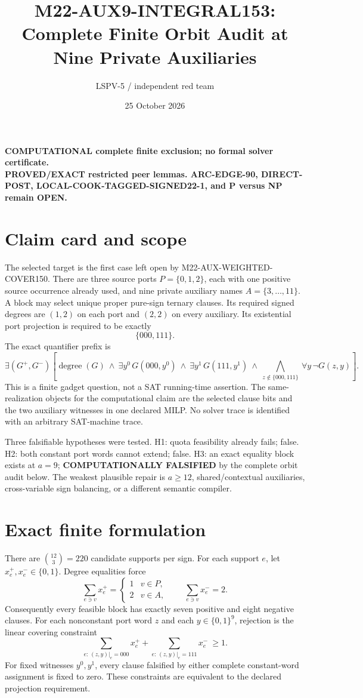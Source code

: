 \documentclass[11pt]{article}
\title{M22-AUX9-INTEGRAL153:\\Complete Finite Orbit Audit at Nine Private Auxiliaries}
\author{LSPV-5 / independent red team}
\date{25 October 2026}
\begin{document}
\maketitle
\begin{center}
\textbf{COMPUTATIONAL complete finite exclusion; no formal solver certificate.}\\
\textbf{PROVED/EXACT restricted peer lemmas. ARC-EDGE-90, DIRECT-POST, LOCAL-COOK-TAGGED-SIGNED22-1, and P versus NP remain OPEN.}
\end{center}

\section{Claim card and scope}
The selected target is the first case left open by
M22-AUX-WEIGHTED-COVER150.  There are three source ports
$P=\{0,1,2\}$, each with one positive source occurrence already used, and
nine private auxiliary names $A=\{3,\ldots,11\}$.  A block may select unique
proper pure-sign ternary clauses.  Its required signed degrees are
$(1,2)$ on each port and $(2,2)$ on every auxiliary.  Its existential port
projection is required to be exactly
\[
 \{000,111\}.
\]
The exact quantifier prefix is
\[
 \exists (G^+,G^-)
 \left[
   \operatorname{degree}(G)\ \wedge\
   \exists y^0\,G(000,y^0)\ \wedge\
   \exists y^1\,G(111,y^1)\ \wedge\
   \bigwedge_{z\notin\{000,111\}}\ \forall y\,\neg G(z,y)
 \right].
\]
This is a finite gadget question, not a SAT running-time assertion.  The
same-realization objects for the computational claim are the selected clause
bits and the two auxiliary witnesses in one declared MILP.  No solver trace
is identified with an arbitrary SAT-machine trace.

Three falsifiable hypotheses were tested.  H1: quota feasibility already
fails; false.  H2: both constant port words cannot extend; false.  H3: an
exact equality block exists at $a=9$; \textbf{COMPUTATIONALLY FALSIFIED} by
the complete orbit audit below.  The weakest plausible repair is $a\ge12$,
shared/contextual auxiliaries, cross-variable sign balancing, or a different
semantic compiler.

\section{Exact finite formulation}
There are $\binom{12}{3}=220$ candidate supports per sign.  For each support
$e$, let $x_e^+,x_e^-\in\{0,1\}$.  Degree equalities force
\[
 \sum_{e\ni v}x_e^+=\begin{cases}1&v\in P,\\2&v\in A,\end{cases}
 \qquad
 \sum_{e\ni v}x_e^-=2.
\]
Consequently every feasible block has exactly seven positive and eight
negative clauses.  For each nonconstant port word $z$ and each
$y\in\{0,1\}^9$, rejection is the linear covering constraint
\[
 \sum_{e:\,(z,y)|_e=000}x_e^+
 +\sum_{e:\,(z,y)|_e=111}x_e^-\ \ge 1.
\]
For fixed witnesses $y^0,y^1$, every clause falsified by either complete
constant-word assignment is fixed to zero.  These constraints are equivalent
to the declared projection requirement.
\end{document}
